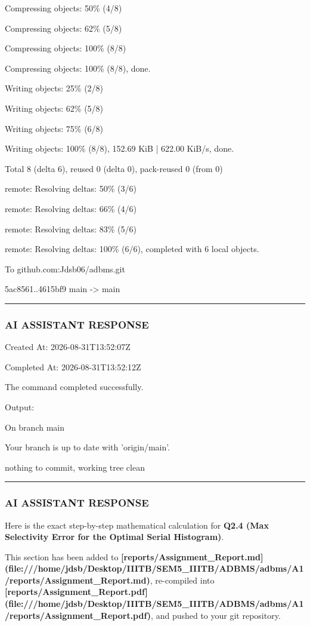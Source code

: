 \documentclass[11pt,a4paper]{article}
\begin{document}
Compressing objects:  50\% (4/8)

Compressing objects:  62\% (5/8)

Compressing objects: 100\% (8/8)

Compressing objects: 100\% (8/8), done.

Writing objects:  25\% (2/8)

Writing objects:  62\% (5/8)

Writing objects:  75\% (6/8)

Writing objects: 100\% (8/8), 152.69 KiB | 622.00 KiB/s, done.

Total 8 (delta 6), reused 0 (delta 0), pack-reused 0 (from 0)

remote: Resolving deltas:  50\% (3/6)

remote: Resolving deltas:  66\% (4/6)

remote: Resolving deltas:  83\% (5/6)

remote: Resolving deltas: 100\% (6/6), completed with 6 local objects.

To github.com:Jdsb06/adbms.git

5ac8561..4615bf9  main -> main


\hrule

\subsubsection{AI ASSISTANT RESPONSE}

Created At: 2026-08-31T13:52:07Z

Completed At: 2026-08-31T13:52:12Z


The command completed successfully.

Output:

On branch main

Your branch is up to date with 'origin/main'.


nothing to commit, working tree clean


\hrule

\subsubsection{AI ASSISTANT RESPONSE}

Here is the exact step-by-step mathematical calculation for \textbf{Q2.4 (Max Selectivity Error for the Optimal Serial Histogram)}.


This section has been added to \textbf{[reports/Assignment\_Report.md](file:///home/jdsb/Desktop/IIITB/SEM5\_IIITB/ADBMS/adbms/A1/reports/Assignment\_Report.md)}, re-compiled into \textbf{[reports/Assignment\_Report.pdf](file:///home/jdsb/Desktop/IIITB/SEM5\_IIITB/ADBMS/adbms/A1/reports/Assignment\_Report.pdf)}, and pushed to your git repository.
\end{document}
